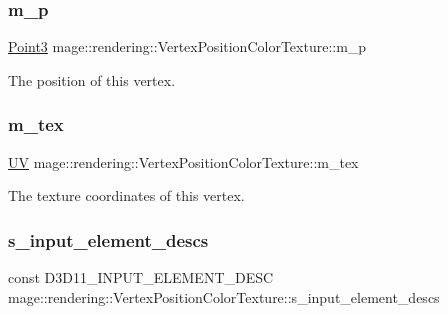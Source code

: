 \subsubsection{\texorpdfstring{m\+\_\+p}{m\_p}}
{\footnotesize\ttfamily \hyperlink{structmage_1_1_point3}{Point3} mage\+::rendering\+::\+Vertex\+Position\+Color\+Texture\+::m\+\_\+p}

The position of this vertex. \hypertarget{structmage_1_1rendering_1_1_vertex_position_color_texture_a48cb88cc9c5d68350249e192152a7104}{}\label{structmage_1_1rendering_1_1_vertex_position_color_texture_a48cb88cc9c5d68350249e192152a7104} 
\subsubsection{\texorpdfstring{m\+\_\+tex}{m\_tex}}
{\footnotesize\ttfamily \hyperlink{structmage_1_1_u_v}{UV} mage\+::rendering\+::\+Vertex\+Position\+Color\+Texture\+::m\+\_\+tex}

The texture coordinates of this vertex. \hypertarget{structmage_1_1rendering_1_1_vertex_position_color_texture_ac80470d80eea7ac62649bc9adb10ae07}{}\label{structmage_1_1rendering_1_1_vertex_position_color_texture_ac80470d80eea7ac62649bc9adb10ae07} 
\subsubsection{\texorpdfstring{s\+\_\+input\+\_\+element\+\_\+descs}{s\_input\_element\_descs}}
{\footnotesize\ttfamily const D3\+D11\+\_\+\+I\+N\+P\+U\+T\+\_\+\+E\+L\+E\+M\+E\+N\+T\+\_\+\+D\+E\+SC mage\+::rendering\+::\+Vertex\+Position\+Color\+Texture\+::s\+\_\+input\+\_\+element\+\_\+descs\hspace{0.3cm}{\ttfamily [static]}}

